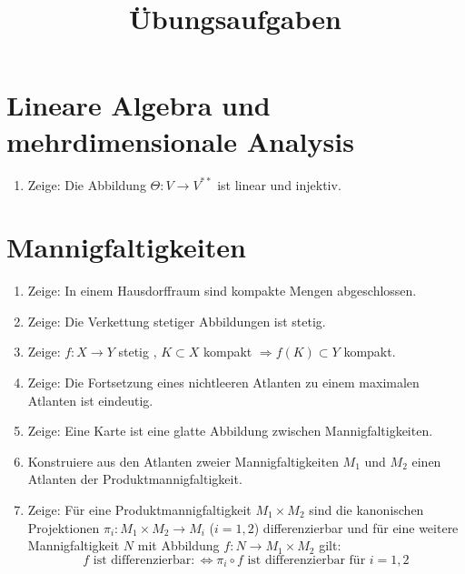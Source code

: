 \documentclass[a4paper]{scrartcl}
\title{Übungsaufgaben}
\begin{document}
	\maketitle
\setcounter{section}{-1}
	\section{Lineare Algebra und mehrdimensionale Analysis}
	\begin{enumerate}
		\item Zeige: Die Abbildung $\Theta\colon V\rightarrow V^{**}$ ist linear und injektiv.
	\end{enumerate}
	\section{Mannigfaltigkeiten}
	\begin{enumerate}
		\item Zeige: In einem Hausdorffraum sind kompakte Mengen abgeschlossen.
		\item Zeige: Die Verkettung stetiger Abbildungen ist stetig.
		\item Zeige: $f\colon X\rightarrow Y$ stetig , $K\subset X$ kompakt $\Rightarrow f(K)\subset Y$ kompakt.
		\item Zeige: Die Fortsetzung eines nichtleeren Atlanten zu einem maximalen Atlanten ist eindeutig.
		\item Zeige: Eine Karte ist eine glatte Abbildung zwischen Mannigfaltigkeiten.
		\item Konstruiere aus den Atlanten zweier Mannigfaltigkeiten $M_1$ und $M_2$ einen Atlanten der Produktmannigfaltigkeit.
		\item Zeige: Für eine Produktmannigfaltigkeit $M_1\times M_2$ sind die kanonischen Projektionen $\pi_i\colon M_1\times M_2\rightarrow M_i$ ($i=1,2$) differenzierbar und für eine weitere Mannigfaltigkeit $N$ mit Abbildung $f\colon N\rightarrow M_1\times M_2$ gilt:
		\begin{equation}
			\text{$f$ ist differenzierbar} \colon\Leftrightarrow \pi_i\circ f \text{ ist differenzierbar für } i=1,2
		\end{equation}
	\end{enumerate}
\end{document}
